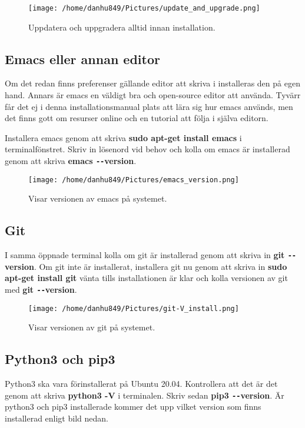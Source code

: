 \documentclass{TDP003mall}
\begin{document}
\begin{figure}[h]
  \centerline{\texttt{[image: /home/danhu849/Pictures/update\_and\_upgrade.png]}}
  \caption{Uppdatera och uppgradera alltid innan installation.}
  \label{fig}
\end{figure}

\subsection{Emacs eller annan editor}
Om det redan finns preferenser gällande editor att skriva i installeras den på egen hand. Annars är emacs en väldigt bra och open-source editor att använda. Tyvärr får det ej i denna installationsmanual plats att lära sig hur emacs används, men det finns gott om resurser online och en tutorial att följa i själva editorn.

Installera emacs genom att skriva \textbf{sudo apt-get install emacs} i terminalfönstret. Skriv in lösenord vid behov och kolla om emacs är installerad genom att skriva \textbf{emacs \texttt{-{}-}version}.
\begin{figure}[h]
  \centerline{\texttt{[image: /home/danhu849/Pictures/emacs\_version.png]}}
  \caption{Visar versionen av emacs på systemet.}
  \label{fig}
\end{figure}

\subsection{Git}
I samma öppnade terminal kolla om git är installerad genom att skriva in \textbf{git \texttt{-{}-}version}. Om git inte är installerat, installera git nu genom att skriva in \textbf{sudo apt-get install git} vänta tills installationen är klar och kolla versionen av git med \textbf{git \texttt{-{}-}version}.

\begin{figure}[h]
  \centerline{\texttt{[image: /home/danhu849/Pictures/git-V\_install.png]}}
  \caption{Visar versionen av git på systemet.}
  \label{fig}
\end{figure}

\subsection{Python3 och pip3}
Python3 ska vara förinstallerat på Ubuntu 20.04. Kontrollera att det är det genom att skriva \textbf{python3 -V} i terminalen. Skriv sedan \textbf{pip3 \texttt{-{}-}version}. Är python3 och pip3 installerade kommer det upp vilket version som finns installerad enligt bild nedan.
\end{document}
